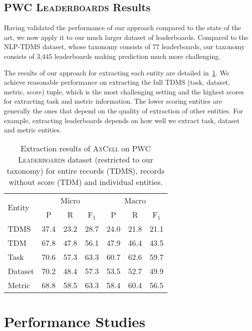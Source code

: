 \documentclass[11pt,a4paper]{article}
\newcommand{\model}{\textsc{AxCell}}
\newcommand{\leaderboards}{\textsc{PWC Leaderboards}}
\begin{document}
\subsection{\leaderboards{} Results}
Having validated the performance of our approach compared to the state of the art, we now apply it to our much larger dataset of leaderboards. Compared to the NLP-TDMS dataset, whose taxonomy consists of 77 leaderboards, our taxonomy consists of 3,445 leaderboards making prediction much more challenging. 

The results of our approach for extracting each entity are detailed in~\cref{tab:results:end-to-end:pwc-leaderboards}. We achieve reasonable performance on extracting the full TDMS (task, dataset, metric, score) tuple, which is the most challenging setting and the highest scores for extracting task and metric information. The lower scoring entities are generally the ones that depend on the quality of extraction of other entities. For example, extracting leaderboards depends on how well we extract task, dataset and metric entities.


\begin{table}[t]
    \small
    \centering
    \setlength{\tabcolsep}{4pt}
    \caption{Extraction results of \model{} on  \leaderboards{} dataset (restricted to our taxonomy) for entire records (TDMS), records without score (TDM) and individual entities.}
    \label{tab:results:end-to-end:pwc-leaderboards}
    \begin{tabular}{lcccccc}
     \toprule
  \multirow{2}{*}{Entity} & \multicolumn{3}{c}{Micro} & \multicolumn{3}{c}{Macro}\\
  \cmidrule(lr){2-4}\cmidrule(lr){5-7}
   & P & R & F$_1$ & P & R & F$_1$\\\midrule
TDMS     & 37.4 & 23.2 & 28.7 & 24.0 & 21.8 & 21.1\\\midrule
TDM      & 67.8 & 47.8 & 56.1 & 47.9 & 46.4 & 43.5\\
Task     & 70.6 & 57.3 & 63.3 & 60.7 & 62.6 & 59.7\\
Dataset  & 70.2 & 48.4 & 57.3 & 53.5 & 52.7 & 49.9\\
Metric   & 68.8 & 58.5 & 63.3 & 58.4 & 60.4 & 56.5\\
\bottomrule
    \end{tabular}
\end{table}
 \section{Performance Studies}
\label{sec:ablation}
\end{document}
